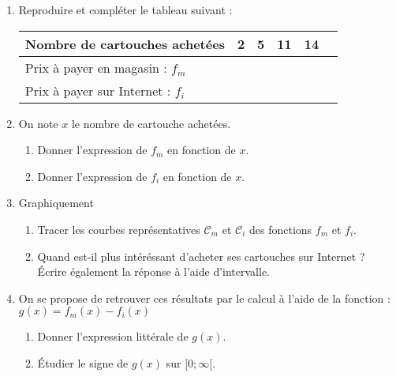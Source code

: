 \documentclass[paper=a4, fontsize=9pt]{scrartcl} %
\begin{document}
\begin{enumerate}
\item Reproduire et compléter le tableau suivant : 
  \begin{center}
    \begin{tabular}{| l || c | c | c | c | c |}
      \hline
      Nombre de cartouches achetées     & 2 & 5 & 11 & 14 \\
      \hline
      Prix à payer en magasin : $f_m$   & \phantom{azerty}  & \phantom{azerty}  & \phantom{azerty} & \phantom{azerty}\\
      \hline
      Prix à payer sur Internet : $f_i$ & \phantom{azerty}  & \phantom{azerty}  & \phantom{azerty} & \phantom{azerty}\\     
      \hline
    \end{tabular}
  \end{center}

\item  On note $x$ le nombre de cartouche achetées.
  \begin{enumerate}
  \item Donner l'expression de $f_m$ en fonction de $x$.
  \item Donner l'expression de $f_i$ en fonction de $x$.
  \end{enumerate} 

\item Graphiquement
  \begin{enumerate}
  \item Tracer les courbes représentatives $\mathcal{C}_m$ et $\mathcal{C}_i$ des fonctions $f_m$ et $f_i$.
  \item Quand est-il plus intéréssant d'acheter ses cartouches sur Internet ? Écrire également la réponse à l'aide d'intervalle.
  \end{enumerate} 

\item On se propose de retrouver ces résultats par le calcul à l'aide de la fonction :  $g(x) = f_m(x) - f_i(x)$
  \begin{enumerate}
  \item Donner l'expression littérale de $g(x)$.
  \item Étudier le signe de $g(x)$ sur $[0 ; \infty[$.
  \end{enumerate} 

\end{enumerate}
\end{document}
